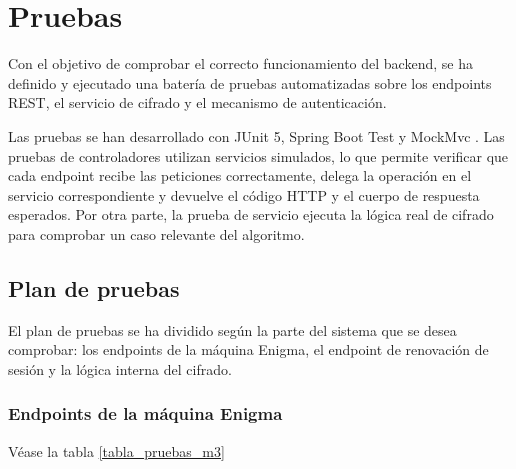 \chapter{Pruebas}
\label{cap:pruebas}

Con el objetivo de comprobar el correcto funcionamiento del backend, se ha definido y ejecutado una batería de pruebas automatizadas sobre los endpoints REST, el servicio de cifrado y el mecanismo de autenticación.

Las pruebas se han desarrollado con JUnit 5, Spring Boot Test y MockMvc \cite{youtube_mockmvc}. Las pruebas de controladores utilizan servicios simulados, lo que permite verificar que cada endpoint recibe las peticiones correctamente, delega la operación en el servicio correspondiente y devuelve el código HTTP y el cuerpo de respuesta esperados. Por otra parte, la prueba de servicio ejecuta la lógica real de cifrado para comprobar un caso relevante del algoritmo.

\section{Plan de pruebas}

El plan de pruebas se ha dividido según la parte del sistema que se desea comprobar: los endpoints de la máquina Enigma, el endpoint de renovación de sesión y la lógica interna del cifrado.

\subsection{Endpoints de la máquina Enigma}

Véase la tabla \ref{tabla_pruebas_m3}

